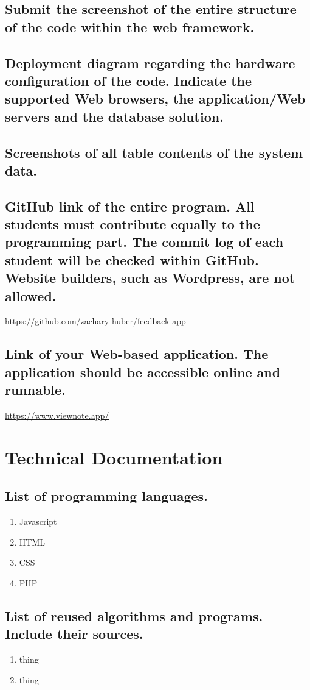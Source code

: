 \documentclass[letterpaper, 12 pt, conference]{ieeeconf}
\begin{document}
\subsection{Submit the screenshot of the entire structure of the code within the web framework.}
\subsection{Deployment diagram regarding the hardware configuration of the code. Indicate the supported Web browsers, the application/Web servers and the database solution.}
\subsection{Screenshots of all table contents of the system data.}
\subsection{GitHub link of the entire program. All students must contribute equally to the programming part. The commit log of each student will be checked within GitHub. Website builders, such as Wordpress, are not allowed.}
\url{https://github.com/zachary-huber/feedback-app}

\subsection{Link of your Web-based application. The application should be accessible online and runnable.}
\url{https://www.viewnote.app/}

\section{Technical Documentation}
\subsection{List of programming languages.}
\begin{enumerate}
   \item Javascript
   \item HTML
   \item CSS
   \item PHP
\end{enumerate}

\subsection{List of reused algorithms and programs. Include their sources.}
\begin{enumerate}
   \item thing
   \item thing
\end{enumerate}
\end{document}
